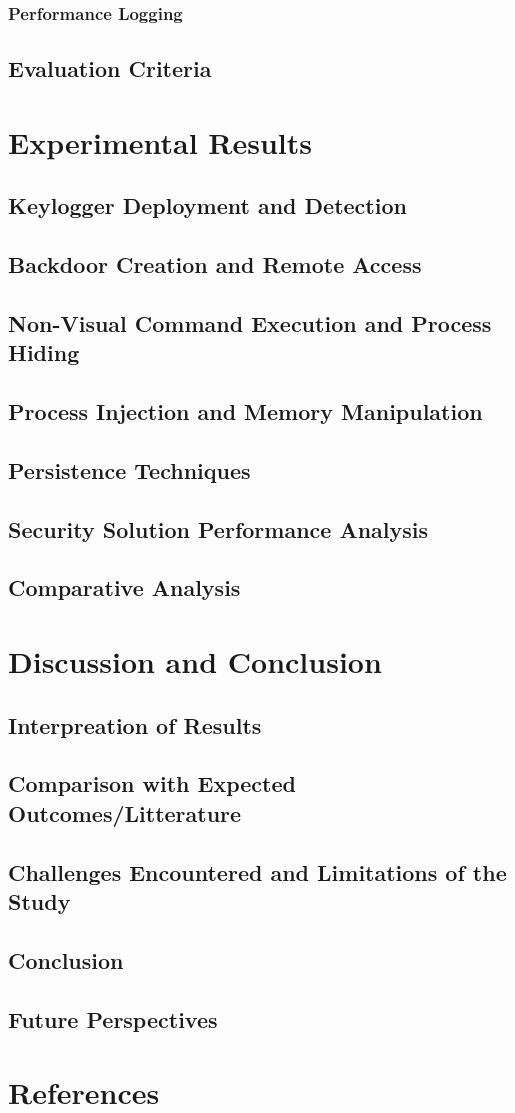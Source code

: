 \documentclass[11pt]{article}
\begin{document}
				\subsubsection{Performance Logging}
			\subsection{Evaluation Criteria}

		\section{Experimental Results}
			\subsection{Keylogger Deployment and Detection}
			\subsection{Backdoor Creation and Remote Access}
			\subsection{Non-Visual Command Execution and Process Hiding}
			\subsection{Process Injection and Memory Manipulation}
			\subsection{Persistence Techniques}
			\subsection{Security Solution Performance Analysis}
			\subsection{Comparative Analysis}
			
		\section{Discussion and Conclusion}
			\subsection{Interpreation of Results}
			\subsection{Comparison with Expected Outcomes/Litterature}
			\subsection{Challenges Encountered and Limitations of the Study}
			\subsection{Conclusion}
			\subsection{Future Perspectives}
			
		\section{References}
		
	
\end{document}
